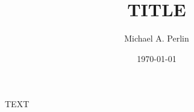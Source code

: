 \documentclass[nofootinbib,notitlepage,11pt]{revtex4-2}
\begin{document}
\title{TITLE}%
\author{Michael A. Perlin}%
\date{\today}

\maketitle

TEXT
\end{document}
